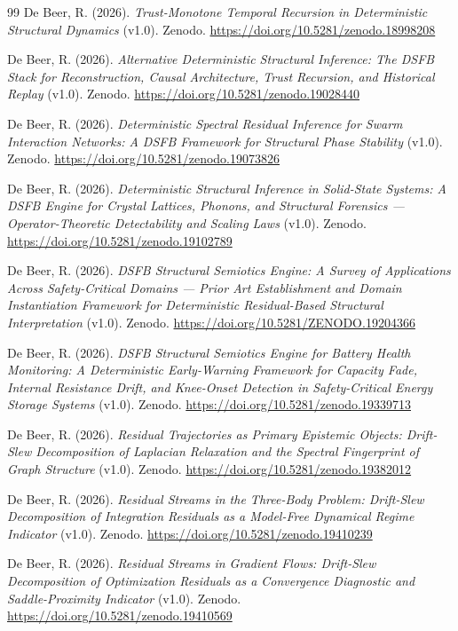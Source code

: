 \documentclass[11pt,letterpaper]{article}
\theoremstyle{gcresult}
\theoremstyle{definition}
\begin{document}
\begin{thebibliography}{99}
De Beer, R. (2026).
\textit{Trust-Monotone Temporal Recursion in Deterministic Structural Dynamics}
(v1.0). Zenodo. \url{https://doi.org/10.5281/zenodo.18998208}

De Beer, R. (2026).
\textit{Alternative Deterministic Structural Inference: The DSFB Stack for
Reconstruction, Causal Architecture, Trust Recursion, and Historical Replay}
(v1.0). Zenodo. \url{https://doi.org/10.5281/zenodo.19028440}

De Beer, R. (2026).
\textit{Deterministic Spectral Residual Inference for Swarm Interaction
Networks: A DSFB Framework for Structural Phase Stability} (v1.0). Zenodo.
\url{https://doi.org/10.5281/zenodo.19073826}

De Beer, R. (2026).
\textit{Deterministic Structural Inference in Solid-State Systems: A DSFB
Engine for Crystal Lattices, Phonons, and Structural Forensics --- Operator-Theoretic
Detectability and Scaling Laws} (v1.0). Zenodo.
\url{https://doi.org/10.5281/zenodo.19102789}

De Beer, R. (2026).
\textit{DSFB Structural Semiotics Engine: A Survey of Applications Across
Safety-Critical Domains --- Prior Art Establishment and Domain Instantiation
Framework for Deterministic Residual-Based Structural Interpretation} (v1.0).
Zenodo. \url{https://doi.org/10.5281/ZENODO.19204366}

De Beer, R. (2026).
\textit{DSFB Structural Semiotics Engine for Battery Health Monitoring: A
Deterministic Early-Warning Framework for Capacity Fade, Internal Resistance
Drift, and Knee-Onset Detection in Safety-Critical Energy Storage Systems}
(v1.0). Zenodo. \url{https://doi.org/10.5281/zenodo.19339713}

De Beer, R. (2026).
\textit{Residual Trajectories as Primary Epistemic Objects: Drift-Slew
Decomposition of Laplacian Relaxation and the Spectral Fingerprint of Graph
Structure} (v1.0). Zenodo. \url{https://doi.org/10.5281/zenodo.19382012}

De Beer, R. (2026).
\textit{Residual Streams in the Three-Body Problem: Drift-Slew Decomposition
of Integration Residuals as a Model-Free Dynamical Regime Indicator} (v1.0).
Zenodo. \url{https://doi.org/10.5281/zenodo.19410239}

De Beer, R. (2026).
\textit{Residual Streams in Gradient Flows: Drift-Slew Decomposition of
Optimization Residuals as a Convergence Diagnostic and Saddle-Proximity
Indicator} (v1.0). Zenodo. \url{https://doi.org/10.5281/zenodo.19410569}


\end{thebibliography}
\end{document}
